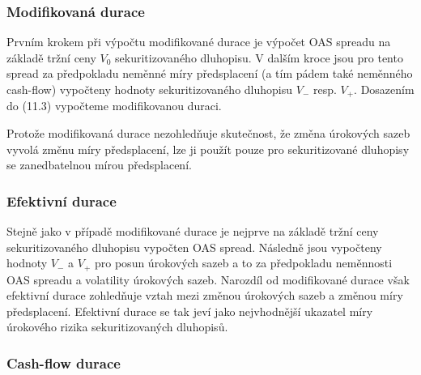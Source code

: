 \documentclass[a4paper]{book}
\begin{document}
\subsubsection{Modifikovaná durace}

Prvním krokem při výpočtu modifikované durace je výpočet OAS spreadu na základě tržní ceny $V_0$ sekuritizovaného dluhopisu. V dalším kroce jsou pro tento spread za předpokladu neměnné míry předsplacení (a tím pádem také neměnného cash-flow) vypočteny hodnoty sekuritizovaného dluhopisu $V_{-}$ resp. $V_{+}$. Dosazením do (11.3) vypočteme modifikovanou duraci.

Protože modifikovaná durace nezohledňuje skutečnost, že změna úrokových sazeb vyvolá změnu míry předsplacení, lze ji použít pouze pro sekuritizované dluhopisy se zanedbatelnou mírou předsplacení. 

\subsubsection{Efektivní durace}

Stejně jako v případě modifikované durace je nejprve na základě tržní ceny sekuritizovaného dluhopisu vypočten OAS spread. Následně jsou vypočteny hodnoty $V_{-}$ a $V_{+}$ pro posun úrokových sazeb a to za předpokladu neměnnosti OAS spreadu a volatility úrokových sazeb. Narozdíl od modifikované durace však efektivní durace zohledňuje vztah mezi změnou úrokových sazeb a změnou míry předsplacení. Efektivní durace se tak jeví jako nejvhodnější ukazatel míry úrokového rizika sekuritizovaných dluhopisů.

\subsubsection{Cash-flow durace}
\end{document}
